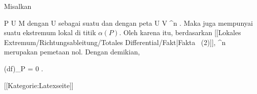 Misalkan

\mavergleichskette
{\vergleichskette
{ P
}
{ \in }{  U
}
{ \subseteq }{ M
}
{    }{
}
{   }{
}
}
{}{}{}
dengan U sebagai suatu
dan dengan peta
\maabb {\alpha} { U } {V \subseteq \R^n
} {.}
Maka
 juga mempunyai suatu ekstremum lokal di titik $\alpha(P)$.
Oleh karena itu, berdasarkan
[[Lokales Extremum/Richtungsableitung/Totales Differential/Fakt|Fakta   (2)]],
 {\R^n } {\R
} {}
merupakan pemetaan nol. Dengan demikian,

\mavergleichskette
{\vergleichskette
{ (df)_P
}
{ = }{ 0
}
{  }{
}
{    }{
}
{   }{
}
}
{}{}{.}

 [[Kategorie:Latexseite]]
